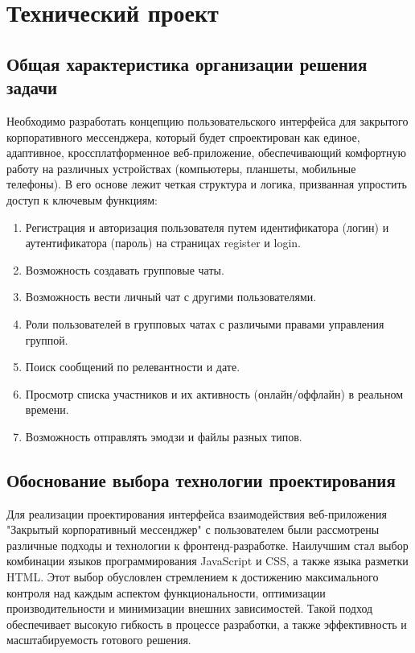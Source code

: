\section{Технический проект}
\subsection{Общая характеристика организации решения задачи}

Необходимо разработать концепцию пользовательского интерфейса для закрытого корпоративного мессенджера, который будет спроектирован как единое, адаптивное, кроссплатформенное веб-приложение, обеспечивающий комфортную работу на различных устройствах (компьютеры, планшеты, мобильные телефоны). В его основе лежит четкая структура и логика, призванная упростить доступ к ключевым функциям:

\begin{enumerate}
	\item Регистрация и авторизация пользователя путем идентификатора (логин) и аутентификатора (пароль) на страницах register и login.
	\item Возможность создавать групповые чаты.
	\item Возможность вести личный чат с другими пользователями. 
	\item Роли пользователей в групповых чатах с различыми правами управления группой.
	\item Поиск сообщений по релевантности и дате.
	\item Просмотр списка участников и их активность (онлайн/оффлайн) в реальном времени.
	\item  Возможность отправлять эмодзи и файлы разных типов.
\end{enumerate}
\subsection{Обоснование выбора технологии проектирования}

Для реализации проектирования интерфейса взаимодействия веб-приложения "Закрытый корпоративный мессенджер" с пользователем были рассмотрены различные подходы и технологии к фронтенд-разработке. Наилучшим стал выбор комбинации языков программирования JavaScript и CSS, а также языка разметки HTML. Этот выбор обусловлен стремлением к достижению максимального контроля над каждым аспектом функциональности, оптимизации производительности и минимизации внешних зависимостей. Такой подход обеспечивает высокую гибкость в процессе разработки, а также эффективность и масштабируемость готового решения. 

